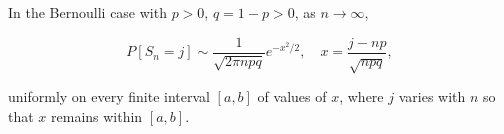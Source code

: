 In the Bernoulli case with $p > 0$, $q = 1 - p > 0$, as $n \to \infty$,

$$P[S_n = j] \sim \frac{1}{\sqrt{2\pi npq}} e^{-x^2/2}, \quad x = \frac{j - np}{\sqrt{npq}},$$

uniformly on every finite interval $[a, b]$ of values of $x$, where $j$ varies with $n$ so that $x$ remains within $[a, b]$.
